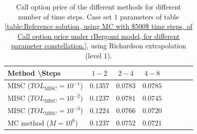 \begin{table}[h!]
	\centering
	\begin{tabular}{l*{6}{c}r}
		Method \textbackslash  Steps    &$1-2$         & $2-4$ & $4-8$ \\
		\hline
		MISC ($TOL_{\text{MISC}}=10^{-1}$)  &$0.1357$  &$0.0783$ & $0.0785$   \\
		MISC ($TOL_{\text{MISC}}=10^{-2}$)  & $0.1237$ &$0.0781$ & $0.0745$   \\

		MISC ($TOL_{\text{MISC}}=10^{-3}$)  & $0.1224$ &$0.0766$ & $0.0720$  \\
		\hline
		MC method ($M=10^6$)  &$	0.1237$ & $0.0752$ & $0.0721$ \\
		\hline
	\end{tabular}
	\caption{Call option price of the different methods for different number of time steps. Case set $1$ parameters of table \ref{table:Reference solution, using MC with $500$ time steps, of Call option price under rBergomi model, for different parameter constellation.}, using Richardson extrapolation (level $1$).}
	\label{table:  Call option price of the different methods for different number of time steps. Case set $1$ parameter, using Richardson extrapolation (level $1$)}
\end{table}





